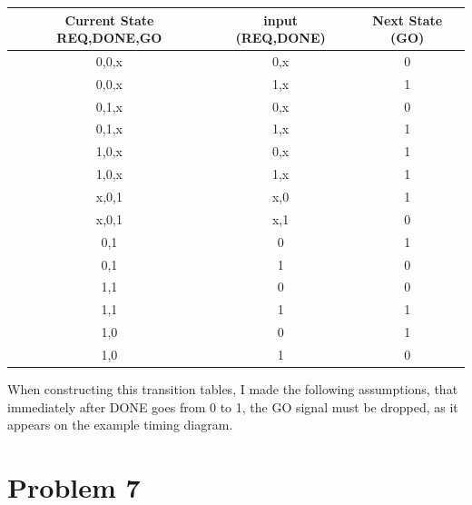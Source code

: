 \documentclass[12pt]{article}
\begin{document}
\begin{center}
    
    \begin{tabular}{|c|c|c|}
        Current State REQ,DONE,GO & input (REQ,DONE) & Next State (GO) \\
        \hline
        0,0,x & 0,x & 0\\
        \hline
        0,0,x & 1,x & 1\\
        \hline
        0,1,x & 0,x & 0\\
        \hline
        0,1,x & 1,x & 1\\
        \hline
        1,0,x & 0,x & 1\\
        \hline
        1,0,x & 1,x & 1\\
        \hline
        x,0,1 & x,0 & 1\\
        \hline
        x,0,1 & x,1 & 0\\
        \hline
        0,1 & 0 & 1\\
        \hline
        0,1 & 1 & 0\\
        \hline
        1,1 & 0 & 0\\
        \hline
        1,1 & 1 & 1\\
        \hline
        1,0 & 0 & 1\\
        \hline
        1,0 & 1 & 0\\
        \hline
    \end{tabular}
\end{center}
When constructing this transition tables, I made the following assumptions,
that immediately after DONE goes from 0 to 1, the GO signal must be dropped,
as it appears on the example timing diagram. 
\section*{Problem 7}
\end{document}
